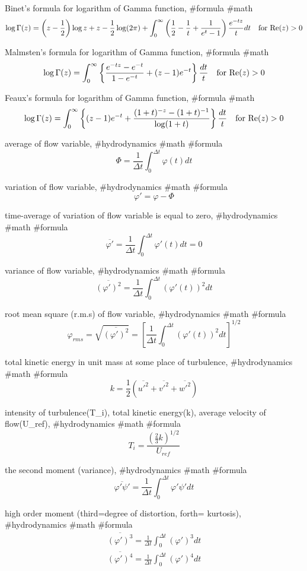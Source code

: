 Binet’s formula for logarithm of Gamma function, #formula #math
$$
\log \Gamma(z)=\left(z-\frac{1}{2}\right)\log z+z-\frac{1}{2}\log(2\pi)+\int^\infty_0\left(\frac{1}{2}-\frac{1}{t}+\frac{1}{e^t-1}\right)\frac{e^{-tz}}{t}dt \quad {\rm for}\,\,{\rm Re}(z)>0
$$

Malmsten’s formula for logarithm of Gamma function, #formula #math
$$
\log \Gamma(z)=\int^\infty_0\left\{\frac{e^{-tz}-e^{-t}}{1-e^{-t}}+(z-1)e^{-t}\right\}\frac{dt}{t} \quad {\rm for}\,\,{\rm Re}(z)>0
$$

Feaux’s formula for logarithm of Gamma function, #formula #math
$$
\log \Gamma(z)=\int^\infty_0\left\{(z-1)e^{-t}+\frac{(1+t)^{-z}-(1+t)^{-1}}{\log(1+t)}\right\}\frac{dt}{t} \quad {\rm for}\,\,{\rm Re}(z)>0
$$

average of flow variable, #hydrodynamics #math #formula
$$
\Phi=\frac{1}{\Delta t}\int^{\Delta t}_0 \varphi(t)dt
$$

variation of flow variable, #hydrodynamics #math #formula
$$
\varphi'=\varphi-\Phi
$$

time-average of variation of flow variable is equal to zero, #hydrodynamics #math #formula
$$
\overline{\varphi'}=\frac{1}{\Delta t}\int^{\Delta t}_0 \varphi'(t)dt=0
$$

variance of flow variable, #hydrodynamics #math #formula
$$
\overline{(\varphi')^2}=\frac{1}{\Delta t}\int^{\Delta t}_0 (\varphi'(t))^2dt
$$

root mean square (r.m.s) of flow variable, #hydrodynamics #math #formula
$$
\varphi_{rms}=\sqrt{\overline{(\varphi')^2}}=\left[\frac{1}{\Delta t}\int^{\Delta t}_0 (\varphi'(t))^2dt\right]^{1/2}
$$

total kinetic energy in unit mass at some place of turbulence, #hydrodynamics #math #formula
$$
k=\frac{1}{2}(\overline{u'^2}+\overline{v'^2}+\overline{w'^2})
$$

intensity of turbulence(T_i), total kinetic energy(k), average velocity of flow(U_{ref}), #hydrodynamics #math #formula
$$
T_i=\frac{\left(\frac{2}{3}k\right)^{1/2}}{U_{ref}}
$$

the second moment (variance), #hydrodynamics #math #formula
$$
\overline{\varphi'\psi'}=\frac{1}{\Delta t}\int^{\Delta t}_0 \varphi'\psi' dt
$$

high order moment (third=degree of distortion, forth= kurtosis), #hydrodynamics #math #formula
$$
\begin{array}{l}
\displaystyle \overline{(\varphi')^3}=\frac{1}{\Delta t}\int^{\Delta t}_0 (\varphi')^3 dt \\
\displaystyle \overline{(\varphi')^4}=\frac{1}{\Delta t}\int^{\Delta t}_0 (\varphi')^4 dt
\end{array}
$$

